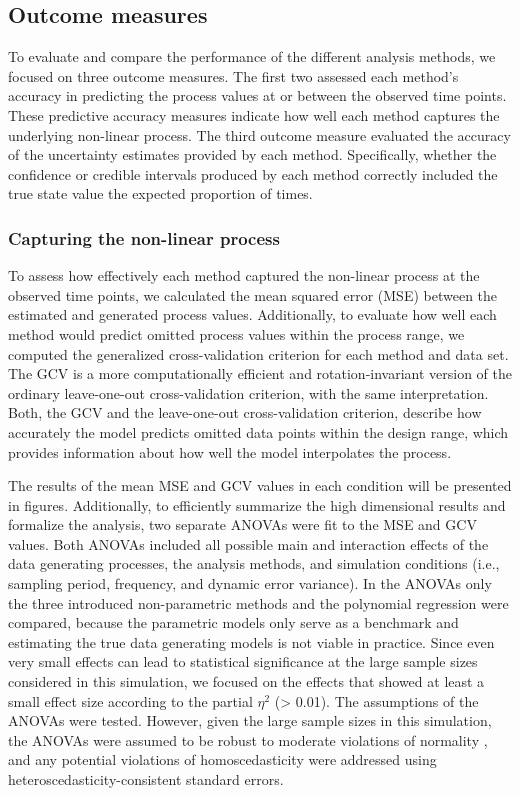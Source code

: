 \documentclass[man, floatsintext]{apa7}
\begin{document}
\subsection{Outcome measures}

To evaluate and compare the performance of the different analysis methods, we
focused on three outcome measures. The first two assessed each method's
accuracy in predicting the process values at or between the observed time
points. These predictive accuracy measures indicate how well each method
captures the underlying non-linear process. The third outcome measure evaluated
the accuracy of the uncertainty estimates provided by each method.
Specifically, whether the confidence or credible intervals produced by each
method correctly included the true state value the expected proportion of
times.

\subsubsection{Capturing the non-linear process}

To assess how effectively each method captured the non-linear process at the
observed time points, we calculated the mean squared error (MSE) between the
estimated and generated process values. Additionally, to evaluate how well each
method would predict omitted process values within the process range, we
computed the generalized cross-validation
\parencite[GCV;][]{golub_generalized_1979} criterion for each method and data
set. The GCV is a more computationally efficient and rotation-invariant version
of the ordinary leave-one-out cross-validation criterion, with the same
interpretation. Both, the GCV and the leave-one-out cross-validation criterion,
describe how accurately the model predicts omitted data points within the
design range, which provides information about how well the model interpolates
the process.

The results of the mean MSE and GCV values in each condition will be presented
in figures. Additionally, to efficiently summarize the high dimensional results
and formalize the analysis, two separate ANOVAs were fit to the MSE and GCV
values. Both ANOVAs included all possible main and interaction effects of the
data generating processes, the analysis methods, and simulation conditions
(i.e., sampling period, frequency, and dynamic error variance). In the ANOVAs
only the three introduced non-parametric methods and the polynomial regression
were compared, because the parametric models only serve as a benchmark and
estimating the true data generating models is not viable in practice. Since
even very small effects can lead to statistical significance at the large
sample sizes considered in this simulation, we focused on the effects that
showed at least a small effect size according to the partial $\eta^2$ (> 0.01).
The assumptions of the ANOVAs were tested. However, given the large sample
sizes in this simulation, the ANOVAs were assumed to be robust to moderate
violations of normality \parencite{blanca_non-normal_2017}, and any potential
violations of homoscedasticity were addressed using
heteroscedasticity-consistent standard errors.
\end{document}
